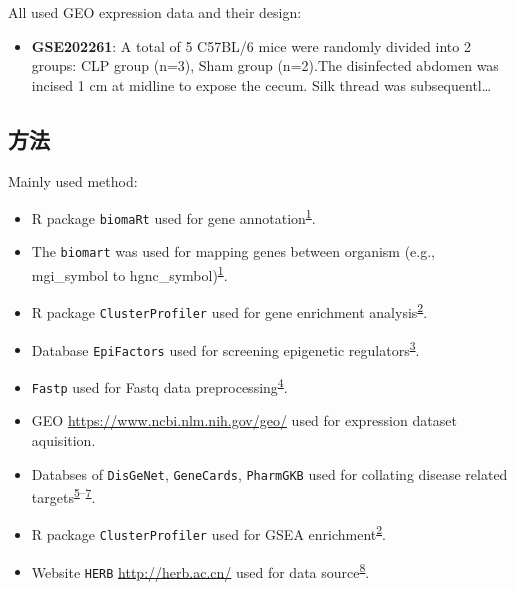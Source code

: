 \documentclass[
]{article}
\providecommand{\tightlist}{%
  \setlength{\itemsep}{0pt}\setlength{\parskip}{0pt}}
\begin{document}
All used GEO expression data and their design:

\begin{itemize}
\tightlist
\item
  \textbf{GSE202261}: A total of 5 C57BL/6 mice were randomly divided into 2 groups: CLP group (n=3), Sham group (n=2).The disinfected abdomen was incised 1 cm at midline to expose the cecum. Silk thread was subsequentl\ldots{}
\end{itemize}

\hypertarget{ux65b9ux6cd5}{%
\subsection{方法}\label{ux65b9ux6cd5}}

Mainly used method:

\begin{itemize}
\tightlist
\item
  R package \texttt{biomaRt} used for gene annotation\textsuperscript{\protect\hyperlink{ref-MappingIdentifDurinc2009}{1}}.
\item
  The \texttt{biomart} was used for mapping genes between organism (e.g., mgi\_symbol to hgnc\_symbol)\textsuperscript{\protect\hyperlink{ref-MappingIdentifDurinc2009}{1}}.
\item
  R package \texttt{ClusterProfiler} used for gene enrichment analysis\textsuperscript{\protect\hyperlink{ref-ClusterprofilerWuTi2021}{2}}.
\item
  Database \texttt{EpiFactors} used for screening epigenetic regulators\textsuperscript{\protect\hyperlink{ref-Epifactors2022Maraku2023}{3}}.
\item
  \texttt{Fastp} used for Fastq data preprocessing\textsuperscript{\protect\hyperlink{ref-UltrafastOnePChen2023}{4}}.
\item
  GEO \url{https://www.ncbi.nlm.nih.gov/geo/} used for expression dataset aquisition.
\item
  Databses of \texttt{DisGeNet}, \texttt{GeneCards}, \texttt{PharmGKB} used for collating disease related targets\textsuperscript{\protect\hyperlink{ref-TheDisgenetKnPinero2019}{5}--\protect\hyperlink{ref-PharmgkbAWorBarbar2018}{7}}.
\item
  R package \texttt{ClusterProfiler} used for GSEA enrichment\textsuperscript{\protect\hyperlink{ref-ClusterprofilerWuTi2021}{2}}.
\item
  Website \texttt{HERB} \url{http://herb.ac.cn/} used for data source\textsuperscript{\protect\hyperlink{ref-HerbAHighThFang2021}{8}}.

\end{itemize}
\end{document}
